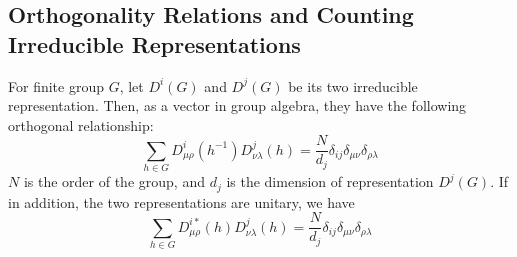 \subsection{Orthogonality Relations and Counting Irreducible
    Representations}
\label{sec:Orthogonality-Relations-and-Counting-Irreducible-Representations}

\begin{thm}
    For finite group $G$, let $D^i(G)$ and $D^j(G)$ be its two
    irreducible representation. Then, as a vector in group algebra,
    they have the following orthogonal
    relationship:
    \begin{equation}
        \sum_{h\in G} D^{i}_{\mu\rho}(h^{-1})D^j_{\nu \lambda}(h) =
        \frac{N}{d_j} \delta_{ij} \delta_{\mu\nu}\delta_{\rho\lambda}
        \label{eq:20161031-ortho-dd-1}
    \end{equation}
    $N$ is the order of the group, and $d_j$ is the
    dimension of representation $D^j(G)$. If in addition, the two
    representations are unitary, we have
    \begin{equation}
        \sum_{h\in G} D^{i*}_{\mu\rho}(h)D^j_{\nu \lambda}(h) =
        \frac{N}{d_j} \delta_{ij} \delta_{\mu\nu}\delta_{\rho\lambda}
        \label{eq:20161031-ortho-dd-2}
    \end{equation}
\end{thm}
